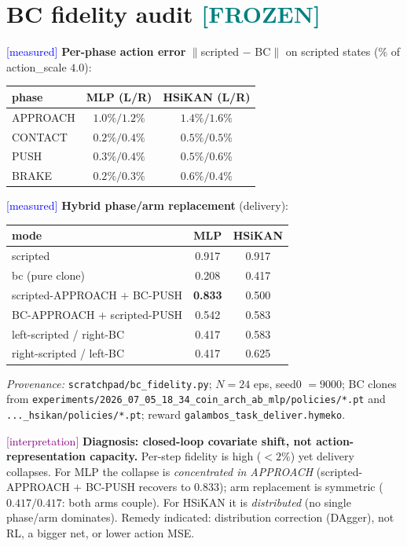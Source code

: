 \documentclass[11pt]{article}
\newcommand{\meas}{\textcolor{blue}{[measured]}}
\newcommand{\interp}{\textcolor{purple}{[interpretation]}}
\newcommand{\frozen}{\textcolor{teal}{\textbf{[FROZEN]}}}
\newcommand{\fn}[1]{\texttt{#1}}
\begin{document}
\section{BC fidelity audit \frozen}
\meas{} \textbf{Per-phase action error} $\lVert$scripted $-$ BC$\rVert$ on scripted states (\% of action\_scale $4.0$):
\begin{center}\begin{tabular}{lcc}
\toprule
phase & MLP (L/R) & HSiKAN (L/R)\\
\midrule
APPROACH & $1.0\%/1.2\%$ & $1.4\%/1.6\%$\\
CONTACT & $0.2\%/0.4\%$ & $0.5\%/0.5\%$\\
PUSH & $0.3\%/0.4\%$ & $0.5\%/0.6\%$\\
BRAKE & $0.2\%/0.3\%$ & $0.6\%/0.4\%$\\
\bottomrule
\end{tabular}\end{center}

\meas{} \textbf{Hybrid phase/arm replacement} (delivery):
\begin{center}\begin{tabular}{lcc}
\toprule
mode & MLP & HSiKAN\\
\midrule
scripted & 0.917 & 0.917\\
bc (pure clone) & 0.208 & 0.417\\
scripted-APPROACH $+$ BC-PUSH & \textbf{0.833} & 0.500\\
BC-APPROACH $+$ scripted-PUSH & 0.542 & 0.583\\
left-scripted / right-BC & 0.417 & 0.583\\
right-scripted / left-BC & 0.417 & 0.625\\
\bottomrule
\end{tabular}\end{center}
\emph{Provenance:} \fn{scratchpad/bc\_fidelity.py}; $N=24$ eps, seed0 $=9000$; BC clones from
\fn{experiments/2026\_07\_05\_18\_34\_coin\_arch\_ab\_mlp/policies/*.pt} and \fn{...\_hsikan/policies/*.pt}; reward
\fn{galambos\_task\_deliver.hymeko}.

\interp{} \textbf{Diagnosis: closed-loop covariate shift, not action-representation capacity.} Per-step fidelity
is high ($<2\%$) yet delivery collapses. For MLP the collapse is \emph{concentrated in APPROACH} (scripted-APPROACH
$+$ BC-PUSH recovers to $0.833$); arm replacement is symmetric ($0.417/0.417$: both arms couple). For HSiKAN it is
\emph{distributed} (no single phase/arm dominates). Remedy indicated: distribution correction (DAgger), not RL, a
bigger net, or lower action MSE.
\end{document}
